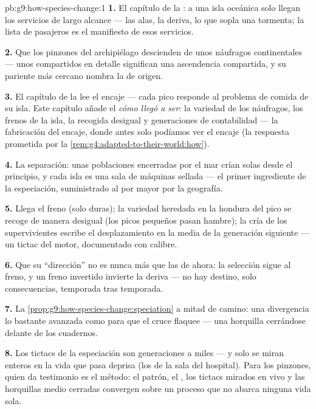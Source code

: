 \begin{solution}{pb:g9:how-species-change:1}
\textbf{1.} El capítulo de la : a una isla oceánica solo
llegan los servicios de largo alcance --- las alas, la deriva, lo que
sopla una tormenta; la lista de pasajeros es el manifiesto de esos
servicios.

\textbf{2.} Que los pinzones del archipiélago descienden de unos
náufragos continentales --- unos  compartidos en detalle
significan una ascendencia compartida, y su pariente más cercano nombra
la  de origen.

\textbf{3.} El capítulo de la  lee el encaje --- cada pico
responde al problema de comida de su isla. Este capítulo añade el
\emph{cómo llegó a ser}: la variedad de los náufragos, los frenos de la
isla, la recogida desigual y generaciones de contabilidad --- la
fabricación del encaje, donde antes solo podíamos ver el encaje (la
respuesta prometida por la
\cref{rem:g4:adapted-to-their-world:how}).

\textbf{4.} La separación: unas poblaciones encerradas por el mar crían
solas desde el principio, y cada isla es una sala de máquinas sellada
--- el primer ingrediente de la especiación, suministrado al por mayor
por la geografía.

\textbf{5.} Llega el freno (solo  duras); la variedad heredada
en la hondura del pico se recoge de manera desigual (los picos pequeños
pasan hambre); la cría de los supervivientes escribe el desplazamiento
en la media de la generación siguiente --- un tictac del motor,
documentado con calibre.

\textbf{6.} Que su ``dirección'' no es nunca más que las  de
ahora: la selección sigue al freno, y un freno invertido invierte la
deriva --- no hay destino, solo consecuencias, temporada tras
temporada.

\textbf{7.} La \cref{prop:g9:how-species-change:speciation} a mitad de
camino: una divergencia lo bastante avanzada como para que el cruce
flaquee --- una horquilla cerrándose delante de los cuadernos.

\textbf{8.} Los tictacs de la especiación son generaciones a miles ---
y solo se miran enteros en la vida que pasa deprisa (los  de
la sala del hospital). Para los pinzones, quien da testimonio es el
método: el patrón, el , los tictacs mirados en vivo y las
horquillas medio cerradas convergen sobre un proceso que no abarca
ninguna vida sola.


\end{solution}
